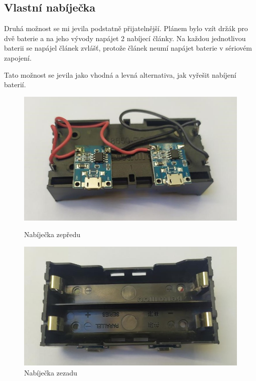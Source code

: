 \subsection*{Vlastní nabíječka}
Druhá možnost se mi jevila podstatně přijatelnější. Plánem bylo vzít držák pro dvě baterie a na jeho vývody napájet 2 nabíjecí články. Na každou jednotlivou baterii se napájel článek zvlášť, protože článek neumí napájet baterie v sériovém zapojení.

Tato možnost se jevila jako vhodná a levná alternativa, jak vyřešit nabíjení baterií. 

    \begin{figure}[htbp]
	\centering
	\begin{minipage}[b]{0.45\textwidth}
		\centering
		\includegraphics[width=1\textwidth]{img/02ele/Nabijecka.jpg}
		\caption{Nabíječka zepředu}
	\end{minipage}
	\qquad
	\begin{minipage}[b]{0.45\textwidth}
		\centering
		\includegraphics[width=1\textwidth]{img/02ele/Nabijecka2.jpg}
		\caption{Nabíječka zezadu}
	\end{minipage}
\end{figure}
\newpage



